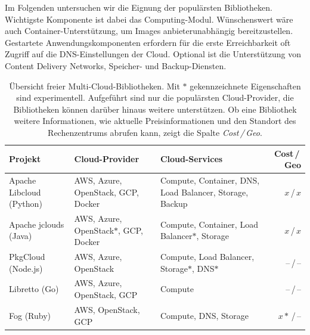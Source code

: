 Im Folgenden untersuchen wir die Eignung der populärsten Bibliotheken. Wichtigste Komponente ist dabei das Computing-Modul. Wünschenswert wäre auch Container-Unterstützung, um Images anbieterunabhängig bereitzustellen. Gestartete Anwendungskomponenten erfordern für die erste Erreichbarkeit oft Zugriff auf die DNS-Einstellungen der Cloud. Optional ist die Unterstützung von Content Delivery Networks, Speicher- und Backup-Diensten.

\begin{table}\centering
	\begin{minipage}{\textwidth}
	\caption{Übersicht freier Multi-Cloud-Bibliotheken. Mit $*$ gekennzeichnete Eigenschaften sind experimentell. Aufgeführt sind nur die populärsten Cloud-Provider, die Bibliotheken können darüber hinaus weitere unterstützen. Ob eine Bibliothek weitere Informationen, wie aktuelle Preisinformationen und den Standort des Rechenzentrums abrufen kann, zeigt die Spalte \emph{Cost\,/\,Geo}.}
	\begin{tabularx}{\textwidth}{>{\centering}XXXr} \toprule
		Projekt & Cloud-Provider & Cloud-Services & Cost\,/\,Geo\\ \midrule
		Apache Libcloud (Python)\footnotemark & AWS, Azure, OpenStack, GCP, Docker & Compute, Container, DNS, Load Balancer, Storage, Backup & $x$\,/\,$x$\\
		Apache jclouds (Java)\footnotemark & AWS, Azure, Open\-Stack$*$, GCP, Docker & Compute, Container, Load Balancer$*$, Storage & $x$\,/\,$x$\\
		PkgCloud (Node.js)\footnotemark & AWS, Azure, OpenStack& Compute, Load Balancer, Storage$*$, DNS$*$ & --\,/\,--\\
		Libretto (Go)\footnotemark & AWS, Azure, OpenStack, GCP & Compute & --\,/\,--\\
		Fog (Ruby)\footnotemark & AWS, OpenStack, GCP & Compute, DNS, Storage & $x*$\,/\,--\\
		\bottomrule
	\end{tabularx}
	\label{tab:bibliotheken}
	\vspace{150pt}
\end{minipage}  
\end{table}

